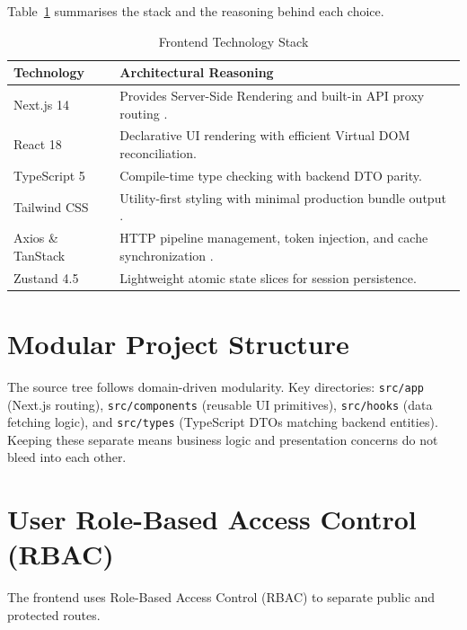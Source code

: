 Table~\ref{tab:frontend-stack} summarises the stack and the reasoning behind each choice.

\begin{table}[H]
\centering
\footnotesize
\caption{Frontend Technology Stack}
\label{tab:frontend-stack}
\begin{tabularx}{\textwidth}{@{}l X@{}}
\toprule
\textbf{Technology} & \textbf{Architectural Reasoning} \\
\midrule
Next.js 14 & Provides Server-Side Rendering and built-in API proxy routing \cite{nextjs2024}. \\
React 18 & Declarative UI rendering with efficient Virtual DOM reconciliation. \\
TypeScript 5 & Compile-time type checking with backend DTO parity. \\
Tailwind CSS & Utility-first styling with minimal production bundle output \cite{tailwind2024}. \\
Axios \& TanStack & HTTP pipeline management, token injection, and cache synchronization \cite{tanstack2024}. \\
Zustand 4.5 & Lightweight atomic state slices for session persistence. \\
\bottomrule
\end{tabularx}
\end{table}

\section{Modular Project Structure}
\label{sec:frontend-project-structure}

The source tree follows domain-driven modularity. Key directories: \texttt{src/app} (Next.js routing), \texttt{src/components} (reusable UI primitives), \texttt{src/hooks} (data fetching logic), and \texttt{src/types} (TypeScript DTOs matching backend entities). Keeping these separate means business logic and presentation concerns do not bleed into each other.

\section{User Role-Based Access Control (RBAC)}
\label{sec:routing-access}

The frontend uses Role-Based Access Control (RBAC) to separate public and protected routes.

